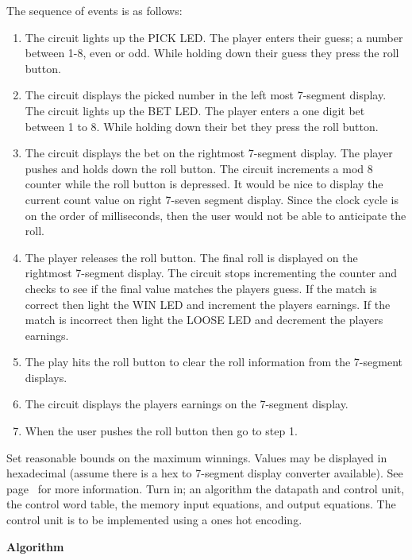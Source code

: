 \begin{enumerate}
The sequence of events is as follows:
\begin{enumerate}
\item	The circuit lights up the PICK LED.
	The player enters their guess; a number between 1-8, even or odd.
	While holding down their guess they press the roll button.
\item	The circuit displays the picked number in the left most
	7-segment display.  The circuit lights up the BET LED.
	The player enters a one digit bet between 1 to 8.  While holding
	down their bet they press the roll button.
\item 	The circuit displays the bet on the rightmost 7-segment
	display.
	The player pushes and holds down the roll button.
	The circuit increments a mod 8 counter while the roll 
	button is depressed. It would be nice to display the
	current count value on right 7-seven segment display.
	Since the clock cycle is on the order of milliseconds,
	then the user would not be able to anticipate the roll.
\item	The player releases the roll button.  The final roll
	is displayed on the rightmost 7-segment display.
	The circuit stops incrementing the counter and checks
	to see if the final value matches the players guess.
	If the match is correct then light the WIN LED and
	increment the players earnings.  If the match is incorrect
	then light the LOOSE LED and decrement the players
	earnings.
\item	The play hits the roll button to clear the roll information
	from the 7-segment displays.
\item	The circuit displays the players earnings on the 7-segment
	display.
\item	When the user pushes the roll button then go to step 1.
\end{enumerate}

Set reasonable bounds on the maximum winnings.  Values may be displayed
in hexadecimal (assume there is a hex to 7-segment display converter
available).  See page~\pageref{page:7seg} for more
information.
Turn in; an algorithm
the datapath and control unit,
the control word table,
the memory input equations, and
output equations.  
The control unit is to be implemented using a ones hot encoding.

\begin{solution}{

{\bf Algorithm}

}
\end{solution}
\end{enumerate}
